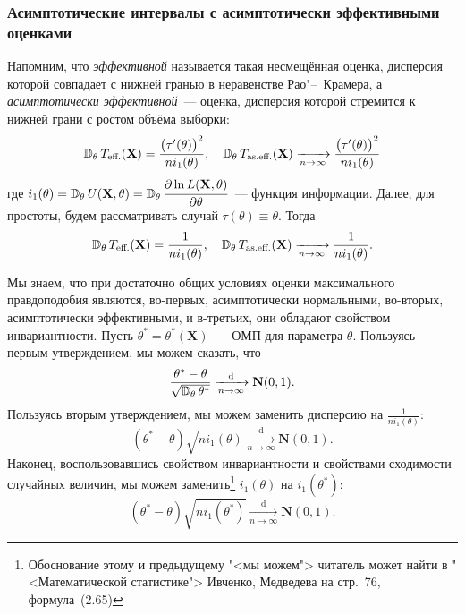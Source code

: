 \subsubsection{Асимптотические интервалы с асимптотически эффективными оценками}

Напомним, что \textit{эффективной} называется такая несмещённая оценка, дисперсия которой совпадает с нижней гранью в неравенстве Рао"--~Крамера, 
а \textit{асимптотически эффективной}~--- оценка, дисперсия которой стремится к нижней грани с ростом объёма выборки:
\begin{equation*}
    \mathbb{D}_{\theta}\, T_{\text{eff.}}(\mathbf{X}) = \frac{\bigl(\tau^{\prime}(\theta)\bigr)^2}{n i_1(\theta)}, \quad 
    \mathbb{D}_{\theta}\, T_{\text{as.eff.}}(\mathbf{X}) \xrightarrow[n \to \infty]{} \frac{\bigl(\tau^{\prime}(\theta)\bigr)^2}{n i_1(\theta)}
\end{equation*}
где $i_1(\theta) = \mathbb{D}_{\theta}\, U(\mathbf{X}, \theta) = \mathbb{D}_{\theta}\, \cfrac{\partial \ln L(\mathbf{X}, \theta)}{\partial \theta}$~---
функция информации.
Далее, для простоты, будем рассматривать случай $\tau(\theta) \equiv \theta$.
Тогда
\begin{equation*}
    \mathbb{D}_{\theta}\, T_{\text{eff.}}(\mathbf{X}) = \frac{1}{n i_1(\theta)}, \quad 
    \mathbb{D}_{\theta}\, T_{\text{as.eff.}}(\mathbf{X}) \xrightarrow[n \to \infty]{} \frac{1}{n i_1(\theta)}.
\end{equation*}

Мы знаем, что при достаточно общих условиях оценки максимального правдоподобия являются, во-первых, асимптотически нормальными,
во-вторых, асимптотически эффективными, и в-третьих, они обладают свойством инвариантности.
Пусть $\theta^* = \theta^*(\mathbf{X})$~--- ОМП для параметра $\theta$.
Пользуясь первым утверждением, мы можем сказать, что 
\begin{equation*}
    \frac{\theta^* - \theta}{\sqrt{\mathbb{D}_{\theta}\, \theta^*}} 
    \xrightarrow[n \to \infty]{\text{d}}
    \mathbf{N}(0, 1).
\end{equation*}
Пользуясь вторым утверждением, мы можем заменить дисперсию на $\frac{1}{n i_1(\theta)}$:
\begin{equation*}
    (\theta^* - \theta) \sqrt{n i_1(\theta)}
    \xrightarrow[n \to \infty]{\text{d}}
    \mathbf{N}(0, 1).
\end{equation*}
Наконец, воспользовавшись свойством инвариантности и свойствами сходимости случайных величин, 
мы можем заменить\footnote{Обоснование этому и предыдущему "<мы можем"> читатель может найти в "<Математической статистике"> Ивченко, Медведева на стр.~76, формула~(2.65)} 
$i_1(\theta)$ на $i_1(\theta^*)$:
\begin{equation*}
    (\theta^* - \theta) \sqrt{n i_1(\theta^*)}
    \xrightarrow[n \to \infty]{\text{d}}
    \mathbf{N}(0, 1).
\end{equation*}

